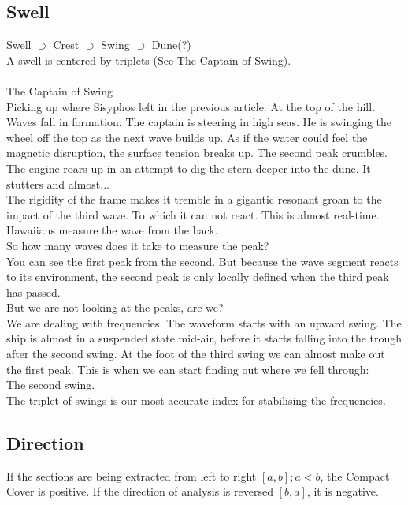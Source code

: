 \documentclass{report}
\begin{document}
\subsection{Swell}
Swell $\supset$ Crest $\supset$ Swing $\supset$ Dune(?)\\
A swell is centered by triplets (See The Captain of Swing).\\\\
The Captain of Swing\\
Picking up where Sisyphos left in the previous article. At the top of the hill. Waves fall in formation. The captain is steering in high seas. He is swinging the wheel off the top as the next wave builds up. As if the water could feel the magnetic disruption, the surface tension breaks up. The second peak crumbles. The engine roars up in an attempt to dig the stern deeper into the dune. It stutters and almost...\\
The rigidity of the frame makes it tremble in a gigantic resonant groan to the impact of the third wave. To which it can not react. This is almost real-time. Hawaiians measure the wave from the back.\\
So how many waves does it take to measure the peak?\\
You can see the first peak from the second. But because the wave segment reacts to its environment, the second peak is only locally defined when the third peak has passed.\\
But we are not looking at the peaks, are we?\\
We are dealing with frequencies. The waveform starts with an upward swing. The ship is almost in a suspended state mid-air, before it starts falling into the trough after the second swing. At the foot of the third swing we can almost make out the first peak. This is when we can start finding out where we fell through:\\
The second swing.\\
The triplet of swings is our most accurate index for stabilising the frequencies.

\subsection*{Direction}
If the sections are being extracted from left to right $[a,b];a<b$, the Compact Cover is positive. If the direction of analysis is reversed $[b,a]$, it is negative.

\iffalse
\printbibliography
\fi
{}

\end{document}

